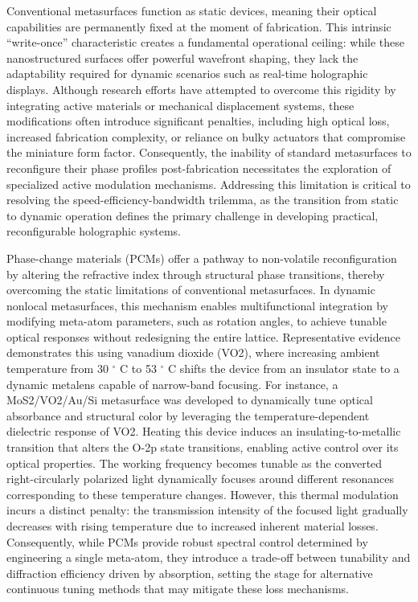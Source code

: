Conventional metasurfaces function as static devices, meaning their optical capabilities are permanently fixed at the moment of fabrication. This intrinsic ``write-once'' characteristic creates a fundamental operational ceiling: while these nanostructured surfaces offer powerful wavefront shaping, they lack the adaptability required for dynamic scenarios such as real-time holographic displays. \citep{doi_10_1002_lpor_71186_5fa1be75} Although research efforts have attempted to overcome this rigidity by integrating active materials or mechanical displacement systems, these modifications often introduce significant penalties, including high optical loss, increased fabrication complexity, or reliance on bulky actuators that compromise the miniature form factor. Consequently, the inability of standard metasurfaces to reconfigure their phase profiles post-fabrication necessitates the exploration of specialized active modulation mechanisms. Addressing this limitation is critical to resolving the speed-efficiency-bandwidth trilemma, as the transition from static to dynamic operation defines the primary challenge in developing practical, reconfigurable holographic systems. \citep{doi_10_1002_nap2_70185_56c8ab30}

Phase-change materials (PCMs) offer a pathway to non-volatile reconfiguration by altering the refractive index through structural phase transitions, thereby overcoming the static limitations of conventional metasurfaces. \citep{doi_10_1515_nanoph_2024_0357_805aeaf6} In dynamic nonlocal metasurfaces, this mechanism enables multifunctional integration by modifying meta-atom parameters, such as rotation angles, to achieve tunable optical responses without redesigning the entire lattice. Representative evidence demonstrates this using vanadium dioxide (VO2), where increasing ambient temperature from 30 \(^\circ\) C to 53 \(^\circ\) C shifts the device from an insulator state to a dynamic metalens capable of narrow-band focusing. For instance, a MoS2/VO2/Au/Si metasurface was developed to dynamically tune optical absorbance and structural color by leveraging the temperature-dependent dielectric response of VO2. Heating this device induces an insulating-to-metallic transition that alters the O-2p state transitions, enabling active control over its optical properties. \citep{doi_10_1515_nanoph_2023_0169_6ba026c6} The working frequency becomes tunable as the converted right-circularly polarized light dynamically focuses around different resonances corresponding to these temperature changes. However, this thermal modulation incurs a distinct penalty: the transmission intensity of the focused light gradually decreases with rising temperature due to increased inherent material losses. Consequently, while PCMs provide robust spectral control determined by engineering a single meta-atom, they introduce a trade-off between tunability and diffraction efficiency driven by absorption, setting the stage for alternative continuous tuning methods that may mitigate these loss mechanisms. \citep{doi_10_1515_nanoph_2024_0357_805aeaf6}

